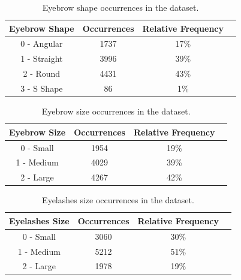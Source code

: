 \documentclass[12pt,a4paper,oneside]{memoir}
\begin{document}
    
    \begin{table}
    \begin{center}
    \begin{tabular}{ |c|c|c|c| } 
    \hline
    Eyebrow Shape & Occurrences & Relative Frequency \\
    \hline
        0 - Angular &  1737 & 17\% \\ 
        1 - Straight & 3996 & 39\% \\ 
        2 - Round & 4431 & 43\% \\ 
        3 - S Shape & 86 & 1\% \\ 

    \hline
    \end{tabular}
    \caption{Eyebrow shape occurrences in the dataset.}
    \label{tab:eshape}
    \end{center}
    \end{table}
    
    
        
    \begin{table}
    \begin{center}
    \begin{tabular}{ |c|c|c|c| } 
    \hline
    Eyebrow Size & Occurrences & Relative Frequency\\
    \hline
        0 - Small &  1954 & 19\% \\ 
        1 - Medium & 4029 & 39\% \\ 
        2 - Large & 4267 & 42\% \\ 

    \hline
    \end{tabular}
    \caption{Eyebrow size occurrences in the dataset.}
    \label{tab:esize}
    \end{center}
    \end{table}
    
    
    
    
       \begin{table}
    \begin{center}
    \begin{tabular}{ |c|c|c|c| } 
    \hline
    Eyelashes Size & Occurrences & Relative Frequency\\
    \hline
        0 - Small & 3060 & 30\% \\ 
        1 - Medium & 5212 & 51\% \\ 
        2 - Large & 1978 & 19\% \\ 

    \hline
    \end{tabular}
    \caption{Eyelashes size occurrences in the dataset.}
    \label{tab:elashessize}
    \end{center}
    \end{table}
    
\end{document}
